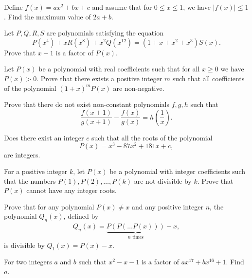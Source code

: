 \begin{question}[name={1996 Iran}]
    Define $f(x)=ax^2+bx+c$ and assume that for $0\leq x \leq 1$, we have $|f(x)|\leq 1$. Find the maximum value of $2a+b$.
\end{question}

\begin{question}
    Let $P,Q,R,S$ are polynomials satisfying the equation
    \[P(x^4)+xR(x^8) + x^2Q(x^{12}) = (1+x+x^2+x^3)S(x).\]
    Prove that $x-1$ is a factor of $P(x)$.
\end{question}


\begin{question}[name={1998 Iran}]
    Let $P(x)$ be a polynomial with real coefficients such that for all $x\geq 0$ we have $P(x) > 0$. Prove that there exists a positive integer $m$ such that all coefficients of the polynomial $(1+x)^mP(x)$ are non-negative.
\end{question}

\begin{question}
    Prove that there do not exist non-constant polynomials $f,g,h$ such that
    \[\frac{f(x+1)}{g(x+1)}-\frac{f(x)}{g(x)} = h\left(\frac{1}{x}\right).\]
\end{question}


\begin{question}
    Does there exist an integer $c$ such that all the roots of the polynomial \[P(x)=x^3-87x^2+181x+c,\] are integers.
\end{question}




\begin{question}
    For a positive integer $k$, let $P(x)$ be a polynomial with integer coefficients such that the numbers $P(1),P(2),\dots,P(k)$ are not divisible by $k$. Prove that $P(x)$ cannot have any integer roots.
\end{question}



\begin{question}[name={1978 Romania}]
    Prove that for any polynomial $P(x)\neq x$ and any positive integer $n$, the polynomial $Q_n(x)$, defined by
    \begin{align*}
        Q_n(x)=\underbrace{P(P(\dots P(x)))}_{n \text{ times}} - x,
    \end{align*}
    is divisible by $Q_1(x)=P(x)-x$.
\end{question}


\begin{question}
    For two integers $a$ and $b$ such that $x^2-x-1$ is a factor of $ax^{17}+bx^{16}+1$. Find $a$.
\end{question}




